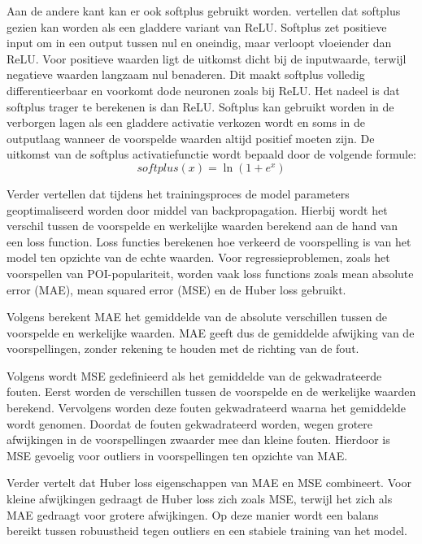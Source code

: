 Aan de andere kant kan er ook softplus gebruikt worden. \textcite{Jagtap2022} vertellen dat softplus gezien kan worden als een gladdere variant van ReLU. Softplus zet positieve input om in een output tussen nul en oneindig, maar verloopt vloeiender dan ReLU. Voor positieve waarden ligt de uitkomst dicht bij de inputwaarde, terwijl negatieve waarden langzaam nul benaderen. Dit maakt softplus volledig differentieerbaar en voorkomt dode neuronen zoals bij ReLU. Het nadeel is dat softplus trager te berekenen is dan ReLU. Softplus kan gebruikt worden in de verborgen lagen als een gladdere activatie verkozen wordt en soms in de outputlaag wanneer de voorspelde waarden altijd positief moeten zijn. De uitkomst van de softplus activatiefunctie wordt bepaald door de volgende formule:
\[ softplus(x) = \ln(1 + e^x) \]

Verder vertellen \textcite{Mienye2024} dat tijdens het trainingsproces de model parameters geoptimaliseerd worden door middel van backpropagation. Hierbij wordt het verschil tussen de voorspelde en werkelijke waarden berekend aan de hand van een loss function. Loss functies berekenen hoe verkeerd de voorspelling is van het model ten opzichte van de echte waarden. Voor regressieproblemen, zoals het voorspellen van POI-populariteit, worden vaak loss functions zoals mean absolute error (MAE), mean squared error (MSE) en de Huber loss gebruikt.

Volgens \textcite{Qi2020} berekent MAE het gemiddelde van de absolute verschillen tussen de voorspelde en werkelijke waarden. MAE geeft dus de gemiddelde afwijking van de voorspellingen, zonder rekening te houden met de richting van de fout.

Volgens \textcite{Ciampiconi2026} wordt MSE gedefinieerd als het gemiddelde van de gekwadrateerde fouten. Eerst worden de verschillen tussen de voorspelde en de werkelijke waarden berekend. Vervolgens worden deze fouten gekwadrateerd waarna het gemiddelde wordt genomen. Doordat de fouten gekwadrateerd worden, wegen grotere afwijkingen in de voorspellingen zwaarder mee dan kleine fouten. Hierdoor is MSE gevoelig voor outliers in voorspellingen ten opzichte van MAE.

Verder vertelt \textcite{Ciampiconi2026} dat Huber loss eigenschappen van MAE en MSE combineert. Voor kleine afwijkingen gedraagt de Huber loss zich zoals MSE, terwijl het zich als MAE gedraagt voor grotere afwijkingen. Op deze manier wordt een balans bereikt tussen robuustheid tegen outliers en een stabiele training van het model.

